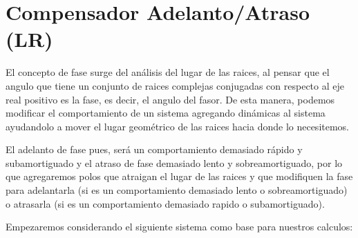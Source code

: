 
\chapter{Compensador Adelanto/Atraso (LR)}

    El concepto de fase surge del análisis del lugar de las raices, al pensar que el angulo que tiene un conjunto de raices complejas conjugadas con respecto al eje real positivo es la fase, es decir, el angulo del fasor. De esta manera, podemos modificar el comportamiento de un sistema agregando dinámicas al sistema ayudandolo a mover el lugar geométrico de las raices hacia donde lo necesitemos.

    El adelanto de fase pues, será un comportamiento demasiado rápido y subamortiguado y el atraso de fase demasiado lento y sobreamortiguado, por lo que agregaremos polos que atraigan el lugar de las raices y que modifiquen la fase para adelantarla (si es un comportamiento demasiado lento o sobreamortiguado) o atrasarla (si es un comportamiento demasiado rapido o subamortiguado).

    Empezaremos considerando el siguiente sistema como base para nuestros calculos:

    \begin{figure}
        \centering
    \end{figure}

